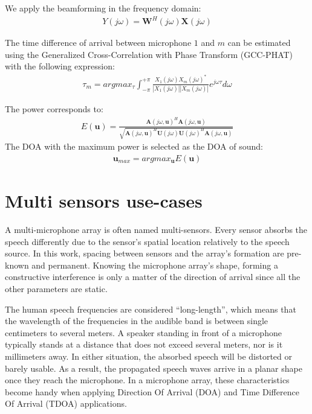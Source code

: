 We apply the beamforming in the frequency domain: 
\begin{align}
    Y(j\omega) = \mathbf{W}^H(j\omega)\mathbf{X}(j\omega)
\end{align}

The time difference of arrival between 
microphone \(1\) and \(m\) can be estimated 
using the Generalized Cross-Correlation 
with Phase Transform (GCC-PHAT) 
with the following expression:
\begin{align}
\displaystyle\tau_m = argmax_{\tau} \int_{-\pi}^{+\pi}{\frac{X_1(j\omega) X_m(j\omega)^*}{|X_1(j\omega)||X_m(j\omega)|}e^{j\omega\tau}}d\omega
\end{align}

The power corresponds to: 
\begin{align}
    \displaystyle E(\mathbf{u}) = \frac{\mathbf{A}(j\omega,\mathbf{u})^H \mathbf{A}(j\omega,\mathbf{u})}{\sqrt{\mathbf{A}(j\omega,\mathbf{u})^H \mathbf{U}(j\omega)\mathbf{U}(j\omega)^H\mathbf{A}(j\omega,\mathbf{u})}}
\end{align}
The DOA with the maximum power is selected as the DOA of sound:
\begin{align}
    \mathbf{u}_{max} = argmax_{\mathbf{u}}{E(\mathbf{u})}
\end{align}

\section{Multi sensors use-cases}
A multi-microphone array is often named multi-sensors. Every sensor
absorbs the speech differently due to the sensor's spatial location
relatively to the speech source. 
In this work, spacing between sensors and the array's 
formation are pre-known and permanent. 
Knowing the microphone array's shape, 
forming a constructive interference 
is only a matter of the direction of 
arrival since all the other parameters are static.


The human speech frequencies are considered ``long-length'',
which means that the wavelength of the 
frequencies in the audible band is 
between single centimeters to several meters. 
A speaker standing in front of a microphone typically stands 
at a distance that does not exceed several meters, nor is it 
millimeters away. In either situation, the absorbed speech
will be distorted or barely usable. As a result, the propagated speech
waves arrive in a planar shape once they reach the microphone.
In a microphone array, 
these characteristics become handy when applying 
Direction Of Arrival (DOA) and 
Time Difference Of Arrival (TDOA) applications.

